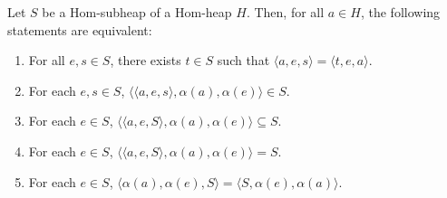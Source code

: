 \documentclass[10pt,a4paper]{amsart}
\begin{document}
\begin{prop}
Let $S$ be a Hom-subheap of a Hom-heap $H$. Then, for all $a \in H$, the following statements are equivalent:
\begin{enumerate}
    \item For all $e, s \in S$, there exists $t \in S$ such that $\langle a, e, s \rangle = \langle t, e, a \rangle$.
    \item For each $e, s \in S$, $\langle \langle a, e, s \rangle, \alpha(a), \alpha(e) \rangle \in S$.
    \item For each $e \in S$, $\langle \langle a, e, S \rangle, \alpha(a), \alpha(e) \rangle \subseteq S$.
    \item For each $e \in S$, $\langle \langle a, e, S \rangle, \alpha(a), \alpha(e) \rangle = S$.
    \item For each $e \in S$, $\langle \alpha(a), \alpha(e), S \rangle = \langle S, \alpha(e), \alpha(a) \rangle$.
\end{enumerate}
\end{prop}
\end{document}
